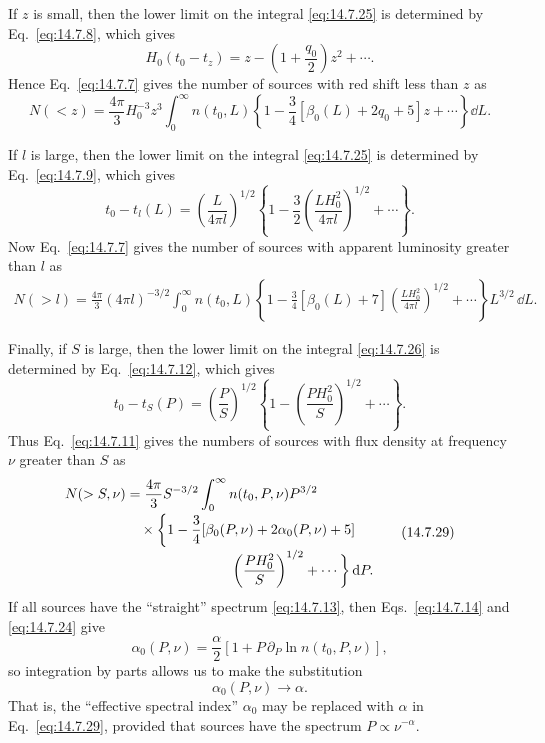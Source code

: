If \(z\) is small, then the lower limit on the integral
\eqref{eq:14.7.25} is determined by Eq.~\eqref{eq:14.7.8}, which gives
\[
  H_0(t_0-t_z)
  =
  z-\left(1+\frac{q_0}{2}\right)z^2+\cdots.
\]
Hence Eq.~\eqref{eq:14.7.7} gives the number of sources with red shift less
than \(z\) as
\begin{equation}
  N(<z)
  =
  \frac{4\pi}{3}H_0^{-3}z^3
  \int_0^\infty
  n(t_0,L)
  \left\{
    1-\frac34[\beta_0(L)+2q_0+5]z+\cdots
  \right\}
  \dd L.
  \tag{14.7.27}\label{eq:14.7.27}
\end{equation}

If \(l\) is large, then the lower limit on the integral
\eqref{eq:14.7.25} is determined by Eq.~\eqref{eq:14.7.9}, which gives
\[
  t_0-t_l(L)
  =
  \left(\frac{L}{4\pi l}\right)^{1/2}
  \left\{
    1
    -\frac32
    \left(\frac{LH_0^2}{4\pi l}\right)^{1/2}
    +\cdots
  \right\}.
\]
Now Eq.~\eqref{eq:14.7.7} gives the number of sources with apparent
luminosity greater than \(l\) as
\begin{align}
  N(>l)
  =
  \frac{4\pi}{3}(4\pi l)^{-3/2}
  \int_0^\infty
  n(t_0,L)
  \left\{
    1
    -\frac34[\beta_0(L)+7]
    \left(\frac{LH_0^2}{4\pi l}\right)^{1/2}
    +\cdots
  \right\}
  L^{3/2}\,\dd L.
  \tag{14.7.28}\label{eq:14.7.28}
\end{align}

Finally, if \(S\) is large, then the lower limit on the integral
\eqref{eq:14.7.26} is determined by Eq.~\eqref{eq:14.7.12}, which gives
\[
  t_0-t_S(P)
  =
  \left(\frac{P}{S}\right)^{1/2}
  \left\{
    1
    -\left(\frac{PH_0^2}{S}\right)^{1/2}
    +\cdots
  \right\}.
\]
Thus Eq.~\eqref{eq:14.7.11} gives the numbers of sources with flux density
at frequency \(\nu\) greater than \(S\) as
\begin{equation}
\begin{aligned}
  N(>S,\nu)
  &=
  \frac{4\pi}{3}S^{-3/2}
  \int_0^\infty
  n(t_0,P,\nu)P^{3/2}
  \\[-2pt]
  &\quad{}\times
  \biggl\{
    1
    -\frac34[
      \beta_0(P,\nu)+2\alpha_0(P,\nu)+5
    ]
  \\[-2pt]
  &\hspace{7.5em}{}
    \left(\frac{PH_0^2}{S}\right)^{1/2}
    +\cdots
  \biggr\}
  \mathop{}\!\mathrm{d} P.
\end{aligned}
\tag{14.7.29}\label{eq:14.7.29}
\end{equation}
If all sources have the ``straight'' spectrum \eqref{eq:14.7.13}, then
Eqs.~\eqref{eq:14.7.14} and \eqref{eq:14.7.24} give
\begin{equation}
  \alpha_0(P,\nu)
  =
  \frac{\alpha}{2}
  \left[
    1+P\,\partial_P\ln n(t_0,P,\nu)
  \right],
  \tag{14.7.30}\label{eq:14.7.30}
\end{equation}
so integration by parts allows us to make the substitution
\begin{equation}
  \alpha_0(P,\nu)\longrightarrow\alpha.
  \tag{14.7.31}\label{eq:14.7.31}
\end{equation}
That is, the ``effective spectral index'' \(\alpha_0\) may be replaced with
\(\alpha\) in Eq.~\eqref{eq:14.7.29}, provided that sources have the
spectrum \(P\propto\nu^{-\alpha}\).

